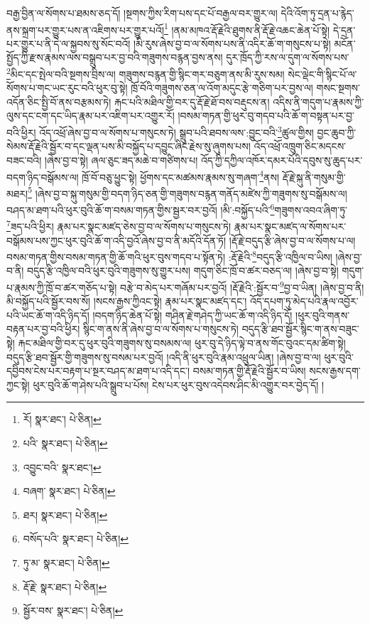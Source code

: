 བརྒྱ་བྱིན་ལ་སོགས་པ་ཐམས་ཅད་དོ། །སྔགས་ཀྱིས་རིག་པས་དང་པོ་བརྒྱལ་བར་གྱུར་ལ། དེའི་འོག་ཏུ་དྲན་པ་རྙེད་ནས་སྐྲག་པར་གྱུར་པས་ན་འཇིགས་པར་གྱུར་པའོ།\footnote{རོ།  སྣར་ཐང་།  པེ་ཅིན། } །ནམ་མཁའ་རྡོ་རྗེའི་ཐུགས་ནི་རྡོ་རྗེ་འཆང་ཆེན་པོ་སྟེ། དེ་དྲན་པར་གྱུར་པ་ནི་དེ་ལ་སྐྱབས་སུ་སོང་བའོ། །མི་རུས་ཞེས་བྱ་བ་ལ་སོགས་པས་ནི་འདིར་ཆོ་ག་གསུངས་པ་སྟེ། མངོན་སྤྱོད་ཀྱི་རྫས་རྣམས་ལས་བསྒྲུབ་པར་བྱ་བའི་གཟུགས་བརྙན་བྱས་ནས། དུར་ཁྲོད་ཀྱི་རས་ལ་དུག་ལ་སོགས་པས་\footnote{པའི་  སྣར་ཐང་།  པེ་ཅིན། }མིང་དང་སྤེལ་བའི་སྔགས་བྲིས་ལ། གཟུགས་བརྙན་གྱི་སྙིང་གར་བཅུག་ནས་མི་རུས་སམ། སེང་ལྡེང་གི་སྙིང་པོ་ལ་སོགས་པ་གང་ཡང་རུང་བའི་ཕུར་བུ་སྟེ། ཁྲོ་བོའི་གཟུགས་ཅན་ལ་འོག་མདུང་རྩེ་གཅིག་པར་བྱས་ལ། གསང་སྔགས་འདོན་ཅིང་སྤྱི་བོ་ནས་བརྩམས་ཏེ། རྐང་པའི་མཐིལ་གྱི་བར་དུ་རྡོ་རྗེ་ཐོ་བས་བརྡུངས་ན། འདིས་ནི་གདུག་པ་རྣམས་ཀྱི་ལུས་དང་ངག་དང་ཡིད་རྣམ་པར་འཇིག་པར་འགྱུར་རོ། །བསམ་གཏན་གྱི་ཕུར་བུ་གདབ་པའི་ཆོ་ག་བསྟན་པར་བྱ་བའི་ཕྱིར། འོད་འཕྲོ་ཞེས་བྱ་བ་ལ་སོགས་པ་གསུངས་ཏེ། སྒྲུབ་པའི་ཐབས་ལས་:བྱུང་བའི་\footnote{འབྱུང་བའི་  སྣར་ཐང་། }ཚུལ་གྱིས། བྱང་ཆུབ་ཀྱི་སེམས་རྡོ་རྗེའི་སྦྱོར་བ་དང་ལྡན་པས་མི་བསྐྱོད་པ་དབྱུང་ཞིང་རྗེས་སུ་ཞུགས་པས། འོད་འཕྲོ་འཁྲུག་ཅིང་མདངས་བཟང་བའི། །ཞེས་བྱ་བ་སྟེ། ཞལ་ཅུང་ཟད་མཆེ་བ་གཙིགས་པ། འོད་ཀྱི་དཀྱིལ་འཁོར་དམར་པོའི་དབུས་སུ་ཆུད་པར་བདག་ཉིད་བསྒོམས་ལ། ཁྲོ་བོ་བཅུ་ཕྱུང་སྟེ། ཕྱོགས་དང་མཚམས་རྣམས་སུ་གཞག་\footnote{བཞག་  སྣར་ཐང་།  པེ་ཅིན། }ནས། རྡོ་རྗེ་སྐུ་ནི་གསུམ་གྱི་མཐར།\footnote{ཐར།  སྣར་ཐང་།  པེ་ཅིན། } །ཞེས་བྱ་བ་སྐུ་གསུམ་གྱི་བདག་ཉིད་ཅན་གྱི་གཟུགས་བརྙན་གནོད་མཛེས་ཀྱི་གཟུགས་སུ་བསྒོམས་ལ། བཤད་མ་ཐག་པའི་ཕུར་བུའི་ཆོ་ག་བསམ་གཏན་གྱིས་སྦྱར་བར་བྱའོ། །མི་:བསྐྱོད་པའི་\footnote{བསོད་པའི་  སྣར་ཐང་།  པེ་ཅིན། }གཟུགས་འབའ་ཞིག་ཏུ་\footnote{ཏུ་མ་  སྣར་ཐང་།  པེ་ཅིན། }ཟད་པའི་ཕྱིར། རྣམ་པར་སྣང་མཛད་ཅེས་བྱ་བ་ལ་སོགས་པ་གསུངས་ཏེ། རྣམ་པར་སྣང་མཛད་ལ་སོགས་པར་བསྒོམས་པས་ཀྱང་ཕུར་བུའི་ཆོ་ག་འདི་བྱའོ་ཞེས་བྱ་བ་ནི་མདོའི་དོན་ཏོ། །རྡོ་རྗེ་བདུད་རྩི་ཞེས་བྱ་བ་ལ་སོགས་པ་ལ། བསམ་གཏན་གྱིས་བསམ་གཏན་གྱི་ཆོ་གའི་ཕུར་བུས་གདབ་པ་སྟོན་ཏེ། :རྡོ་རྗེའི་\footnote{རྡོ་རྗེ་  སྣར་ཐང་།  པེ་ཅིན། }བདུད་རྩི་འཁྱིལ་བ་ཡིས། །ཞེས་བྱ་བ་ནི། བདུད་རྩི་འཁྱིལ་བའི་ཕུར་བུའི་གཟུགས་སུ་གྱུར་པས། གདུག་ཅིང་ཁྲོ་བ་ཚར་བཅད་ལ། །ཞེས་བྱ་བ་སྟེ། གདུག་པ་རྣམས་ཀྱི་ཁྲོ་བ་ཚར་གཅོད་པ་སྟེ། བརྩེ་བ་མེད་པར་གཞོམ་པར་བྱའོ། །རྡོ་རྗེའི་:སྦྱོར་བ་\footnote{སྦྱོར་བས་  སྣར་ཐང་།  པེ་ཅིན། }བྱ་བ་ཡིན། །ཞེས་བྱ་བ་ནི། མི་བསྐྱོད་པའི་སྦྱོར་བས་སོ། །སངས་རྒྱས་ཀྱིའང་སྟེ། རྣམ་པར་སྣང་མཛད་དང་། འོད་དཔག་ཏུ་མེད་པའི་རྣལ་འབྱོར་པའི་ཡང་ཆོ་ག་འདི་ཉིད་དོ། །བདག་ཉིད་ཆེན་པོ་སྟེ། གཤིན་རྗེ་གཤེད་ཀྱི་ཡང་ཆོ་ག་འདི་ཉིད་དོ། །ཕུར་བུའི་གནས་བརྟན་པར་བྱ་བའི་ཕྱིར། སྙིང་ག་ནས་ནི་ཞེས་བྱ་བ་ལ་སོགས་པ་གསུངས་ཏེ། བདུད་རྩི་ཐབ་སྦྱོར་སྙིང་ག་ནས་བཟུང་སྟེ། རྐང་མཐིལ་གྱི་བར་དུ་ཕུར་བུའི་གཟུགས་སུ་བསམས་ལ། ཕུར་བུ་དེ་ཉིད་ལྟེ་བ་ནས་གོང་བུའང་དམ་ཚིག་སྟེ། བདུད་རྩི་ཐབ་སྦྱོར་གྱི་གཟུགས་སུ་བསམ་པར་བྱའོ། །འདི་ནི་ཕུར་བུའི་རྣམ་འཕྲུལ་ཡིན། །ཞེས་བྱ་བ་ལ། ཕུར་བུའི་དབྱིབས་ངེས་པར་བརྟག་པ་སྔར་བཤད་མ་ཐག་པ་འདི་དང་། བསམ་གཏན་གྱི་རྡོ་རྗེའི་སྦྱོར་བ་ཡིས། སངས་རྒྱས་དག་ཀྱང་སྟེ། ཕུར་བུའི་ཆོ་ག་ཤེས་པའི་སྒྲུབ་པ་པོས། ངེས་པར་ཕུར་བུས་འདེབས་ཤིང་མི་འགྱུར་བར་བྱེད་དོ། །

